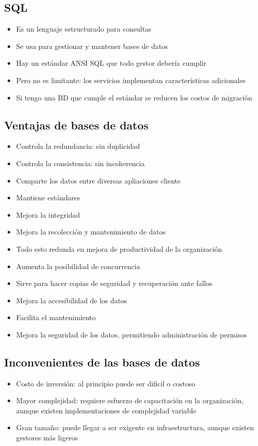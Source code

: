 \subsection{SQL}
\begin{itemize}
    \item Es un lenguaje estructurado para consultas 
    \item Se usa para gestionar y mantener bases de datos 
    \item Hay un estándar ANSI SQL que todo gestor debería cumplir 
    \item Pero no es limitante: los servicios implementan características 
    adicionales
    \item Si tengo una BD que cumple el estándar se reducen los costos de migración
\end{itemize}

\subsection{Ventajas de bases de datos}
\begin{itemize}
    \item Controla la redundancia: sin duplicidad
    \item Controla la consistencia: sin incoherencia
    \item Comparte los datos entre diversas apliaciones cliente
    \item Mantiene estándares 
    \item Mejora la integridad 
    \item Mejora la recolección y mantenimiento de datos 
    \item Todo esto redunda en mejora de productividad de la organización 
    \item Aumenta la posibilidad de concurrencia 
    \item Sirve para hacer copias de seguridad y recuperación ante fallos 
    \item Mejora la accesibilidad de los datos 
    \item Facilita el mantenimiento 
    \item Mejora la seguridad de los datos, permitiendo administración de permisos
\end{itemize}

\subsection{Inconvenientes de las bases de datos}
\begin{itemize}
    \item Costo de inversión: al principio puede ser dificil o costoso
    \item Mayor complejidad: requiere esfuerzo de capacitación en la organización,
    aunque existen implementaciones de complejidad variable
    \item Gran tamaño: puede llegar a ser exigente en infraestructura,
    aunque existen gestores más ligeros
\end{itemize}

